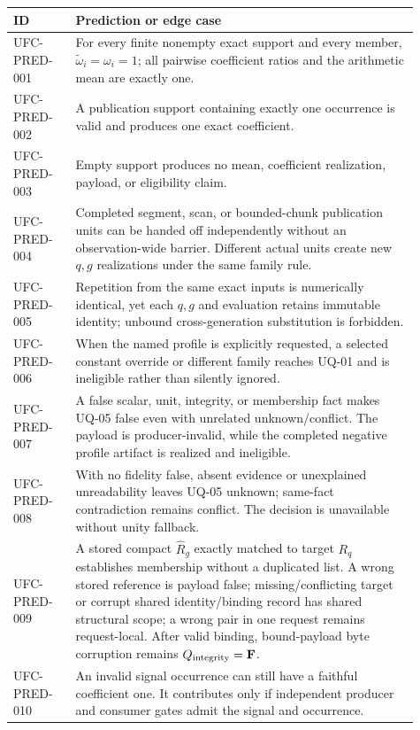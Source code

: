 \begin{longtable}{p{0.14\linewidth}p{0.77\linewidth}}
\toprule
ID & Prediction or edge case\\
\midrule
\endhead
UFC-PRED-001 & For every finite nonempty exact support and every member,
\(\widetilde\omega_i=\omega_i=1\); all pairwise coefficient ratios and the
arithmetic mean are exactly one.\\
UFC-PRED-002 & A publication support containing exactly one occurrence is
valid and produces one exact coefficient.\\
UFC-PRED-003 & Empty support produces no mean, coefficient realization,
payload, or eligibility claim.\\
UFC-PRED-004 & Completed segment, scan, or bounded-chunk publication units can
be handed off independently without an observation-wide barrier. Different
actual units create new \(q,g\) realizations under the same family rule.\\
UFC-PRED-005 & Repetition from the same exact inputs is numerically identical,
yet each \(q,g\) and evaluation retains immutable identity; unbound
cross-generation substitution is forbidden.\\
UFC-PRED-006 & When the named profile is explicitly requested, a selected
constant override or different family reaches UQ-01 and is ineligible rather
than silently ignored.\\
UFC-PRED-007 & A false scalar, unit, integrity, or membership fact makes
UQ-05 false even with unrelated unknown/conflict. The payload is
producer-invalid, while the completed negative profile artifact is realized
and ineligible.\\
UFC-PRED-008 & With no fidelity false, absent evidence or unexplained
unreadability leaves UQ-05 unknown; same-fact contradiction remains conflict.
The decision is unavailable without unity fallback.\\
UFC-PRED-009 & A stored compact \(\widehat R_g\) exactly matched to target
\(R_q\) establishes membership without a duplicated list. A wrong stored
reference is payload false; missing/conflicting target or corrupt shared
identity/binding record has shared structural scope; a wrong pair in one
request remains request-local. After valid binding, bound-payload byte
corruption remains \(Q_{\rm integrity}=\mathbf F\).\\
UFC-PRED-010 & An invalid signal occurrence can still have a faithful
coefficient one. It contributes only if independent producer and consumer
gates admit the signal and occurrence.\\

\end{longtable}
